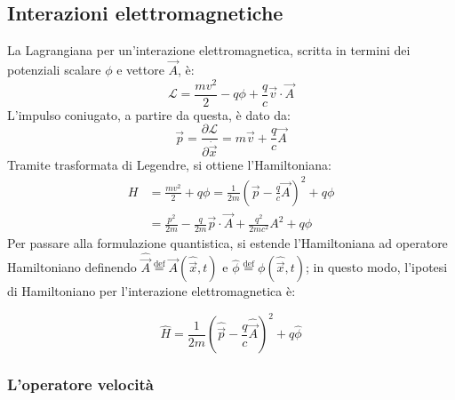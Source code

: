 \documentclass[11pt, a4paper]{scrartcl} %
\numberwithin{equation}{subsection}
\theoremstyle{style2}
\theoremstyle{style1}
\newenvironment{boxenv}[1][]{
    \begin{eqbox}[#1]
    }{
   \end{eqbox}
}
\begin{document}
\subsection{Interazioni elettromagnetiche}

La Lagrangiana per un'interazione elettromagnetica, scritta in termini dei potenziali scalare $\phi $ e vettore $\vec{A}$, \`e:
\begin{equation}
	\mathcal{L } = \frac{mv^2}{2} - q \phi + \frac{q}{c}\vec{v}\cdot \vec{A}
\end{equation}
L'impulso coniugato, a partire da questa, \`e dato da:
\begin{equation}
	\vec{p}= \frac{\partial \mathcal{L} }{\partial \dot{\vec{x}}} = m\vec{v}+ \frac{q}{c}\vec{A}
\end{equation}
Tramite trasformata di Legendre, si ottiene l'Hamiltoniana:
\begin{equation}
	\begin{split}
		H &= \frac{mv^2}{2} + q \phi  = \frac{1}{2m}\left(\vec{p} - \frac{q}{c}\vec{A}\right) ^2 + q\phi \\
		  & = \frac{p^2}{2m} - \frac{q}{2m}\vec{p}\cdot \vec{A} + \frac{q^2}{2mc^2}A^2 + q\phi 
	\end{split}
\end{equation}
Per passare alla formulazione quantistica, si estende l'Hamiltoniana ad operatore Hamiltoniano definendo $\hat{\vec{A}} \overset{\text{def}}{=} \vec{A} (\hat{\vec{x}},t)$ e $\hat{\phi }\overset{\text{def}}{=} \phi (\hat{\vec{x}},t)$; in questo modo, l'ipotesi di Hamiltoniano per l'interazione elettromagnetica \`e:
\begin{boxenv}[]
\begin{equation}
	\hat{H} = \frac{1}{2m} \left(\hat{\vec{p}}- \frac{q}{c}\hat{\vec{A}}\right) ^2 + q \hat{\phi }
\end{equation}
\end{boxenv}
\subsubsection{L'operatore velocit\`a}
\end{document}
